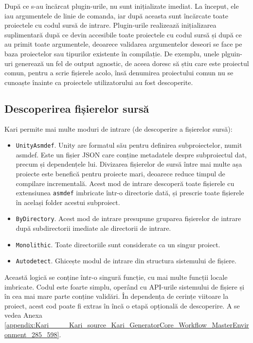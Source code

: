 \documentclass[a4paper,12pt]{report}
\begin{document}
După ce s-au încărcat plugin-urile, nu sunt inițializate imediat.
La început, ele iau argumentele de linie de comanda, iar după aceasta sunt încărcate toate proiectele cu codul sursă de intrare.
Plugin-urile realizează inițializarea suplimentară după ce devin accesibile toate proiectele cu codul sursă și după ce au primit toate argumentele, deoarece validarea argumentelor deseori se face pe baza proiectelor sau tipurilor existente în compilație.
De exemplu, unele plguin-uri generează un fel de output agnostic, de aceea doresc să știu care este proiectul comun, pentru a scrie fișierele acolo, însă denumirea proiectului comun nu se cunoaște înainte ca proiectele utilizatorului au fost descoperite.

\subsection{Descoperirea fișierelor sursă}

Kari permite mai multe moduri de intrare (de descoperire a fișierelor sursă):

\begin{itemize}
  \item \texttt{UnityAsmdef}.
    Unity are formatul său pentru definirea subproiectelor, numit asmdef.
    Este un fișier JSON care conține metadatele despre subproiectul dat, precum și dependențele lui.
    Divizarea fișierelor de sursă între mai multe așa proiecte este benefică pentru proiecte mari, deoarece reduce timpul de compilare incrementală.
    Acest mod de intrare descoperă toate fișierele cu extensiunea \texttt{asmdef} imbricate într-o directorie dată, și prescrie toate fișierele în același folder acestui subproiect.

  \item \texttt{ByDirectory}. Acest mod de intrare presupune gruparea fișierelor de intrare după subdirectorii imediate ale directorii de intrare.

  \item \texttt{Monolithic}. Toate directoriile sunt considerate ca un singur proiect.

  \item \texttt{Autodetect}. Ghicește modul de intrare din structura sistemului de fișiere.
\end{itemize}

Această logică se conține într-o singură funcție, cu mai multe funcții locale imbricate.
Codul este foarte simplu, operând cu \ac{API}-urile sistemului de fișiere și în cea mai mare parte conține validări.
În dependența de cerințe viitoare la proiect, acest cod poate fi extras în încă o etapă opțională de descoperire.
A se vedea Anexa \ref{appendix:Kari____Kari_source_Kari_GeneratorCore_Workflow_MasterEnvironment_285_598}.
\end{document}
